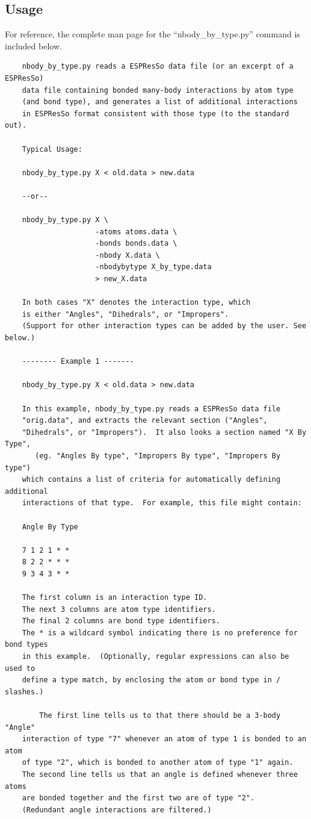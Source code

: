 \documentclass[11pt]{article}
\begin{document}
\subsection{Usage}
For reference, the complete man page for the ``nbody\_by\_type.py''
command is included below.
\begin{verbatim}
    nbody_by_type.py reads a ESPResSo data file (or an excerpt of a ESPResSo)
    data file containing bonded many-body interactions by atom type
    (and bond type), and generates a list of additional interactions
    in ESPResSo format consistent with those type (to the standard out).

    Typical Usage:

    nbody_by_type.py X < old.data > new.data

    --or--

    nbody_by_type.py X \
                     -atoms atoms.data \
                     -bonds bonds.data \
                     -nbody X.data \
                     -nbodybytype X_by_type.data
                     > new_X.data

    In both cases "X" denotes the interaction type, which 
    is either "Angles", "Dihedrals", or "Impropers".
    (Support for other interaction types can be added by the user. See below.)

    -------- Example 1 -------

    nbody_by_type.py X < old.data > new.data

    In this example, nbody_by_type.py reads a ESPResSo data file 
    "orig.data", and extracts the relevant section ("Angles", 
    "Dihedrals", or "Impropers").  It also looks a section named "X By Type",
       (eg. "Angles By type", "Impropers By type", "Impropers By type")
    which contains a list of criteria for automatically defining additional 
    interactions of that type.  For example, this file might contain:

    Angle By Type

    7 1 2 1 * *
    8 2 2 * * *
    9 3 4 3 * *

    The first column is an interaction type ID.
    The next 3 columns are atom type identifiers.
    The final 2 columns are bond type identifiers.
    The * is a wildcard symbol indicating there is no preference for bond types
    in this example.  (Optionally, regular expressions can also be used to
    define a type match, by enclosing the atom or bond type in / slashes.)

        The first line tells us to that there should be a 3-body "Angle" 
    interaction of type "7" whenever an atom of type 1 is bonded to an atom
    of type "2", which is bonded to another atom of type "1" again.
    The second line tells us that an angle is defined whenever three atoms 
    are bonded together and the first two are of type "2".
    (Redundant angle interactions are filtered.)


\end{verbatim}
\end{document}

